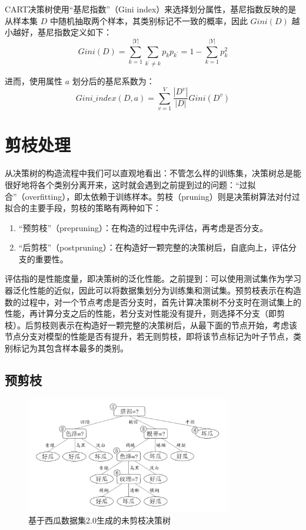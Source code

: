 \documentclass[12pt, a4paper]{article} %
\begin{document}
CART决策树使用“基尼指数”（Gini index）来选择划分属性，基尼指数反映的是从样本集 $D$ 中随机抽取两个样本，其类别标记不一致的概率，因此 $Gini(D)$ 越小越好，基尼指数定义如下：
\begin{equation*}
    Gini(D) = \sum_{k = 1}^{|Y|} \sum_{k^\prime \ne k} p_k p_{k^\prime} = 1 - \sum_{k = 1}^{|Y|} p_k^2
\end{equation*}

进而，使用属性 $a$ 划分后的基尼系数为：
\begin{equation*}
    Gini\_index(D, a) = \sum_{v = 1}^{V} \frac{|D^v|}{|D|} Gini(D^v)
\end{equation*}

\section{剪枝处理}

从决策树的构造流程中我们可以直观地看出：不管怎么样的训练集，决策树总是能很好地将各个类别分离开来，这时就会遇到之前提到过的问题：“过拟合”（overfitting），即太依赖于训练样本。剪枝（pruning）则是决策树算法对付过拟合的主要手段，剪枝的策略有两种如下：

\begin{enumerate}[\hspace*{2em} i.]
    \item “预剪枝”（prepruning）：在构造的过程中先评估，再考虑是否分支。
    \item “后剪枝”（postpruning）：在构造好一颗完整的决策树后，自底向上，评估分支的重要性。
\end{enumerate}

评估指的是性能度量，即决策树的泛化性能。之前提到：可以使用测试集作为学习器泛化性能的近似，因此可以将数据集划分为训练集和测试集。预剪枝表示在构造数的过程中，对一个节点考虑是否分支时，首先计算决策树不分支时在测试集上的性能，再计算分支之后的性能，若分支对性能没有提升，则选择不分支（即剪枝）。后剪枝则表示在构造好一颗完整的决策树后，从最下面的节点开始，考虑该节点分支对模型的性能是否有提升，若无则剪枝，即将该节点标记为叶子节点，类别标记为其包含样本最多的类别。

\subsection{预剪枝}

\begin{figure}[H]
    \centering
    \includegraphics[width=0.8\textwidth]{../img/4-3-基于西瓜数据集2.0生成的未剪枝决策树.png}
    \caption{基于西瓜数据集2.0生成的未剪枝决策树}
    \label{fig:基于西瓜数据集2.0生成的未剪枝决策树}
\end{figure}
\end{document}
